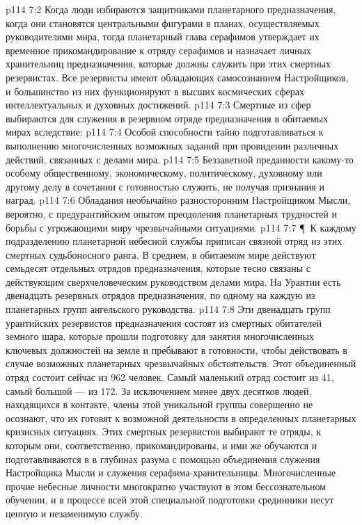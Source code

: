 \vs p114 7:2 Когда люди избираются защитниками планетарного предназначения, когда они становятся центральными фигурами в планах, осуществляемых руководителями мира, тогда планетарный глава серафимов утверждает их временное прикомандирование к отряду серафимов и назначает личных хранительниц предназначения, которые должны служить при этих смертных резервистах. Все резервисты имеют обладающих самосознанием Настройщиков, и большинство из них функционируют в высших космических сферах интеллектуальных и духовных достижений.
\vs p114 7:3 Смертные из сфер выбираются для служения в резервном отряде предназначения в обитаемых мирах вследствие:
\vs p114 7:4 \bibnobreakspace Особой способности тайно подготавливаться к выполнению многочисленных возможных заданий при провидении различных действий, связанных с делами мира.
\vs p114 7:5 \bibnobreakspace Беззаветной преданности какому\hyp{}то особому общественному, экономическому, политическому, духовному или другому делу в сочетании с готовностью служить, не получая признания и наград.
\vs p114 7:6 \bibnobreakspace Обладания необычайно разносторонним Настройщиком Мысли, вероятно, с предурантийским опытом преодоления планетарных трудностей и борьбы с угрожающими миру чрезвычайными ситуациями.
\vs p114 7:7 \P\ К каждому подразделению планетарной небесной службы приписан связной отряд из этих смертных судьбоносного ранга. В среднем, в обитаемом мире действуют семьдесят отдельных отрядов предназначения, которые тесно связаны с действующим сверхчеловеческим руководством делами мира. На Урантии есть двенадцать резервных отрядов предназначения, по одному на каждую из планетарных групп ангельского руководства.
\vs p114 7:8 Эти двенадцать групп урантийских резервистов предназначения состоят из смертных обитателей земного шара, которые прошли подготовку для занятия многочисленных ключевых должностей на земле и пребывают в готовности, чтобы действовать в случае возможных планетарных чрезвычайных обстоятельств. Этот объединенный отряд состоит сейчас из 962 человек. Самый маленький отряд состоит из 41, самый большой --- из 172. За исключением менее двух десятков людей, находящихся в контакте, члены этой уникальной группы совершенно не осознают, что их готовят к возможной деятельности в определенных планетарных кризисных ситуациях. Этих смертных резервистов выбирают те отряды, к которым они, соответственно, прикомандированы, и ими же обучаются и подготавливаются в в глубинах разума с помощью объединения служения Настройщика Мысли и служения серафима\hyp{}хранительницы. Многочисленные прочие небесные личности многократно участвуют в этом бессознательном обучении, и в процессе всей этой специальной подготовки срединники несут ценную и незаменимую службу.

